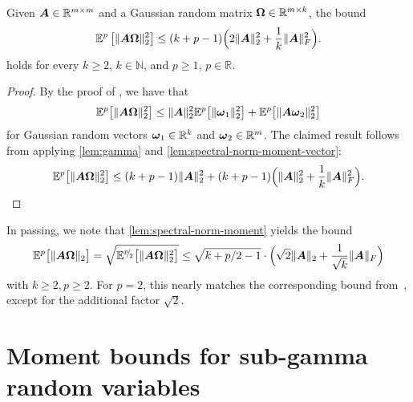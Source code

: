 \begin{lemma}\label{lem:spectral-norm-moment}
    Given $\boldsymbol{A} \in \mathbb{R}^{m \times m}$ and a Gaussian random matrix $\boldsymbol{\Omega} \in \mathbb{R}^{m \times k}$, the bound
    \begin{equation*}
        \mathbb{E}^{p}\left[ \lVert \boldsymbol{A} \boldsymbol{\Omega} \rVert _2^2 \right]
        \leq  (k + p-1) \Big( 2 \lVert \boldsymbol{A} \rVert _2^2 + \frac{1}{k} \lVert \boldsymbol{A} \rVert _F^2 \Big).
    \end{equation*}
    holds for every $k \ge 2$, $k\in \mathbb{N}$, and $p \ge 1$, $p\in \mathbb R$.
\end{lemma}%
\begin{proof}
    By the proof of \cite[Lemma B.1]{tropp-2023-randomized-algorithms}, we have that
    \begin{equation*}
        \mathbb{E}^{p}\big[ \lVert \boldsymbol{A} \boldsymbol{\Omega} \rVert _2^2 \big]
        \leq \lVert \boldsymbol{A} \rVert _2^2 \mathbb{E}^{p}\big[ \lVert \boldsymbol{\omega}_1 \rVert _2^2 \big] + \mathbb{E}^{p}\big[ \lVert \boldsymbol{A} \boldsymbol{\omega}_2 \rVert _2^2 \big]
    \end{equation*}
    for Gaussian random vectors $\boldsymbol{\omega}_1 \in \mathbb{R}^{k}$ and $\boldsymbol{\omega}_2 \in \mathbb{R}^{m}$. The claimed result follows from applying \cref{lem:gamma} and \cref{lem:spectral-norm-moment-vector}:
    \begin{equation*}
        \mathbb{E}^{p}\big[ \lVert \boldsymbol{A} \boldsymbol{\Omega} \rVert _2^2 \big]
        \leq (k + p - 1) \lVert \boldsymbol{A} \rVert _2^2  + (k + p - 1) \Big( \lVert \boldsymbol{A} \rVert _2^2 + \frac{1}{k} \lVert \boldsymbol{A} \rVert _F^2 \Big).
    \end{equation*}
\end{proof}


In passing, we note that \cref{lem:spectral-norm-moment}  yields the bound
    \begin{equation*}
        \mathbb{E}^{p}\big[ \lVert \boldsymbol{A} \boldsymbol{\Omega} \rVert _2 \big] = \sqrt{\mathbb{E}^{{}^{p}{\mskip -5mu/\mskip -3mu}_{2}}\big[ \lVert \boldsymbol{A} \boldsymbol{\Omega} \rVert _2^2 \big]} \leq \sqrt{k + p/2-1} \cdot \Big(\sqrt{2} \lVert \boldsymbol{A} \rVert _2 + \frac{1}{\sqrt{k}}\lVert \boldsymbol{A} \rVert_F\Big)
    \end{equation*}
    with $k\ge 2, p\ge 2$. For $p = 2$, this nearly matches the corresponding bound from~\cite[Lemma B.1]{tropp-2023-randomized-algorithms}, except for the additional factor $\sqrt{2}$.

\section{Moment bounds for sub-gamma random variables}

